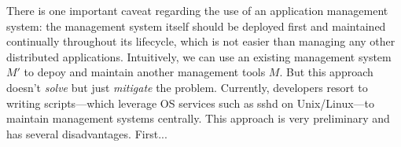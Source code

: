 There is one important caveat regarding the use of an
application management system: the management system itself
should be deployed first and maintained continually
throughout its lifecycle, which is not easier than managing
any other distributed applications. Intuitively, we can use
an existing management system $M'$ to depoy and maintain
another management tools $M$. But this approach doesn't
\emph{solve} but just \emph{mitigate} the problem.
Currently, developers resort to writing scripts---which
leverage OS services such as sshd on Unix/Linux---to
maintain management systems centrally. This approach is very
preliminary and has several disadvantages. First...

% 
% 
% 
% 
% 
% 
% 
% 
% 
% 
% 

